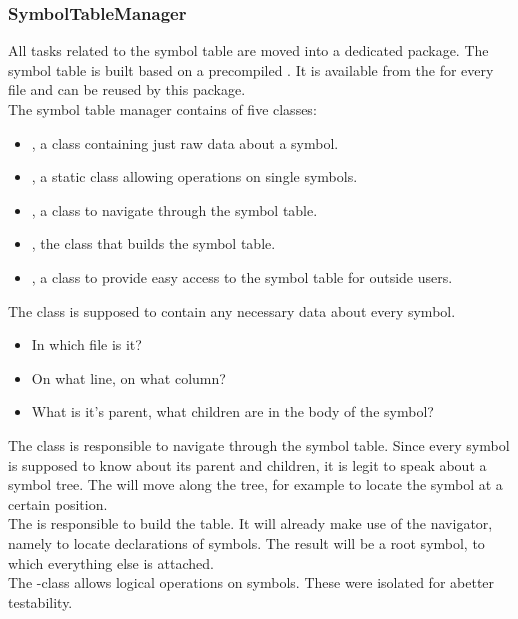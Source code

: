 \subsubsection{SymbolTableManager}
All tasks related to the symbol table are moved into a dedicated package.
The symbol table is built based on a precompiled .
It is available from the  for every file and can be reused by this package.\\

The symbol table manager contains of five classes:
\begin{itemize}
    \item {}, a class containing just raw data about a symbol.
    \item {}, a static class allowing operations on single symbols.
    \item {}, a class to navigate through the symbol table.
    \item {}, the class that builds the symbol table.
    \item {}, a class to provide easy access to the symbol table for outside users.
\end{itemize}

The class  is supposed to contain any necessary data about every symbol.
\begin{itemize}
    \item In which file is it?
    \item On what line, on what column?
    \item What is it's parent, what children are in the body of the symbol?
\end{itemize}


The class  is responsible to navigate through the symbol table.
Since every symbol is supposed to know about its parent and children, it is legit to speak about a symbol tree.
The  will move along the tree, for example to locate the symbol at a certain position.\\

The  is responsible to build the table.
It will already make use of the navigator, namely to locate declarations of symbols.
The result will be a root symbol, to which everything else is attached.\\

The -class allows logical operations on symbols.
These were isolated for abetter testability.\\

